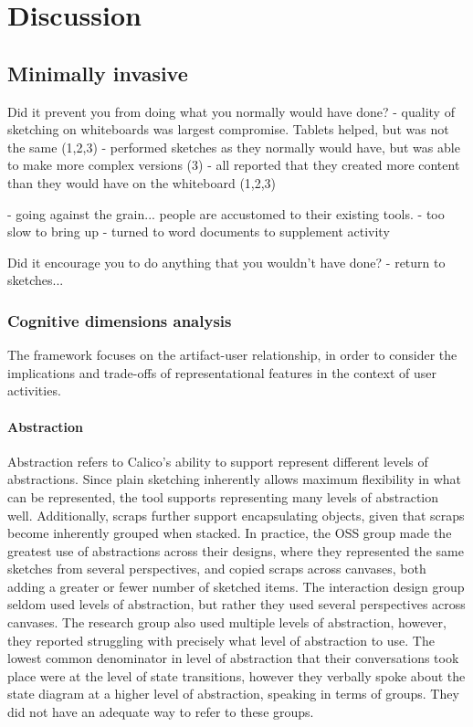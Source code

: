 \chapter{Discussion}
\label{chapter:discussion}

\section{Minimally invasive}

Did it prevent you from doing what you normally would have done?
- quality of sketching on whiteboards was largest compromise. Tablets helped, but was not the same (1,2,3)
- performed sketches as they normally would have, but was able to make more complex versions (3)
- all reported that they created more content than they would have on the whiteboard (1,2,3)

- going against the grain... people are accustomed to their existing tools.
- too slow to bring up
- turned to word documents to supplement activity

Did it encourage you to do anything that you wouldn't have done?
- return to sketches...

\subsection{Cognitive dimensions analysis}

The framework focuses on the artifact-user relationship, in order to consider the implications and trade-offs of representational features in the context of user activities.

\subsubsection{Abstraction}
Abstraction refers to Calico's ability to support represent different levels of abstractions. Since plain sketching inherently allows maximum flexibility in what can be represented, the tool supports representing many levels of abstraction well. Additionally, scraps further support encapsulating objects, given that scraps become inherently grouped when stacked. In practice, the OSS group made the greatest use of abstractions across their designs, where they represented the same sketches from several perspectives, and copied scraps across canvases, both adding a greater or fewer number of sketched items. The interaction design group seldom used levels of abstraction, but rather they used several perspectives across canvases. The research group also used multiple levels of abstraction, however, they reported struggling with precisely what level of abstraction to use. The lowest common denominator in level of abstraction that their conversations took place were at the level of state transitions, however they verbally spoke about the state diagram at a higher level of abstraction, speaking in terms of groups. They did not have an adequate way to refer to these groups.

